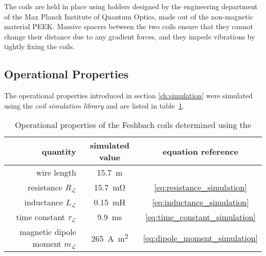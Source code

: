 The coils are held in place using holders designed by the engineering department of the Max Planck Institute of Quantum Optics, made out of the non-magnetic material PEEK. Massive spacers between the two coils ensure that they cannot change their distance due to any gradient forces, and they impede vibrations by tightly fixing the coils.

\subsection*{Operational Properties}
The operational properties introduced in section \ref{ch:simulation} were simulated using the \textit{coil simulation library} and are listed in table~\ref{tab:operational_properties}.


\begin{table}
    \centering
    \begin{tabular}{rcc}
        \toprule
        \textbf{quantity} & \textbf{simulated value}  & \textbf{equation reference} \\
        \toprule
        wire length & \SI{15.7}{\meter} & \\
        resistance $R_\mathcal{L}$ & \SI{15.7}{\milli\ohm} & \eqref {eq:resistance_simulation} \\
        inductance $L_\mathcal{L}$ & \SI{0.15}{\milli\henry} & \eqref{eq:inductance_simulation} \\ 
        time constant $\tau_\mathcal{L}$ & \SI{9.9}{\milli\second} & \eqref{eq:time_constant_simulation}\\
        magnetic dipole moment $m_\mathcal{L}$ & \SI{265}{\ampere\square\meter} & \eqref{eq:dipole_moment_simulation} \\
        \bottomrule
    \end{tabular}
    \caption{Operational properties of the Feshbach coils determined using the }
    \label{tab:operational_properties}
\end{table}


